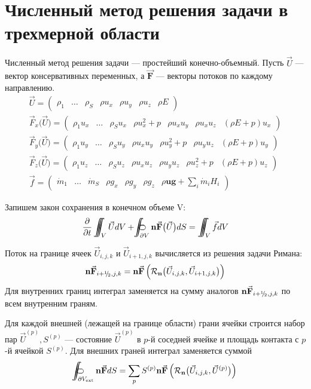 \documentclass[12pt]{article}
\newcommand{\pd}[2]{\frac{\partial #1}{\partial #2}}
\newcommand{\bvec}[1]{\boldsymbol{\mathbf{#1}}}
\newcommand{\cutefrac}[2]{{}^{#1}\mkern-5mu/{\!}_#2}
\newcommand{\half}{{\cutefrac{1}{2}}}
\renewcommand{\iiint}{\int\hspace{-10pt}\int\hspace{-10pt}\int}
\newcommand{\oiint}{%
{}\subset\hspace{-6pt}\supset\hspace{-17.8pt}%
\int\hspace{-10pt}\int%
}%
\begin{document}
\section{Численный метод решения задачи в трехмерной области}
Численный метод решения задачи --- простейший конечно-объемный. Пусть $\vec{U}$ --- вектор консервативных 
переменных, а $\vec{\bvec{F}}$ --- векторы потоков по каждому направлению.
\begin{gather*}
\vec{U} = \begin{pmatrix}
\rho_1 & \dots & \rho_S & \rho u_x & \rho u_y & \rho u_z & \rho E
\end{pmatrix}\\
\vec{F}_x\big(\vec{U}\big) = \begin{pmatrix}
\rho_1 u_x & \dots & \rho_S u_x & \rho u_x^2 + p & \rho u_x u_y & \rho u_x u_z & (\rho E + p) u_x
\end{pmatrix}\\
\vec{F}_y\big(\vec{U}\big) = \begin{pmatrix}
\rho_1 u_y & \dots & \rho_S u_y & \rho u_x u_y & \rho u_y^2 + p & \rho u_y u_z & (\rho E + p) u_y
\end{pmatrix}\\
\vec{F}_z\big(\vec{U}\big) = \begin{pmatrix}
\rho_1 u_z & \dots & \rho_S u_z & \rho u_x u_z & \rho u_y u_z & \rho u_z^2 + p & (\rho E + p) u_z
\end{pmatrix}\\
\vec{f} = \begin{pmatrix}
\dot m_1 & \dots & \dot m_S & \rho g_x & \rho g_y & \rho g_z & \rho\bvec{u}\bvec{g} + \sum_i \dot 
m_i 
H_i
\end{pmatrix}
\end{gather*}

Запишем закон сохранения в конечном объеме V:
\begin{equation}
\pd{}{t} \iiint_V \vec{U} dV + \oiint_{\partial V} \bvec{n}\vec{\bvec{F}}\big(\vec{U}\big) dS = 
\iiint_V \vec{f} dV
\end{equation}

Поток на границе ячеек $\vec{U}_{i,j,k}$ и $\vec{U}_{i+1,j,k}$ вычисляется из решения задачи Римана:
\[
\bvec{n}\vec{\bvec{F}}_{i+\half,j,k} = 
\bvec{n}\vec{\bvec{F}}\left(\mathcal{R}_{\bvec{n}}\big(\vec{U}_{i,j,k},\vec{U}_{i+1,j,k}\big)\right)
\]
Для внутренних границ интеграл заменяется на сумму аналогов 
$\bvec{n}\vec{\bvec{F}}_{i+\half,j,k}$ по всем внутренним граням.

Для каждой внешней (лежащей на границе области) грани ячейки строится набор пар $\vec{U}^{(p)}, S^{(p)}$ --- состояние $\vec{U}^{(p)}$ в $p$-й соседней ячейке и площадь контакта с $p$-й ячейкой $S^{(p)}$.
Для внешних граней интеграл заменяется суммой
\[
\oiint_{\partial V_\text{ext}}  \bvec{n}\vec{\bvec{F}} dS 
= \sum_p S^{(p)} \bvec{n} \vec{\bvec{F}}
\left(\mathcal{R}_{\bvec{n}}\big(\vec{U}_{i,j,k},\vec{U}^{(p)}\big)\right)
\]
\end{document}

